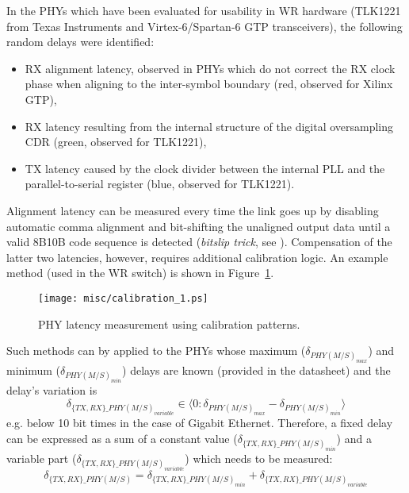 In the PHYs which have been evaluated for usability in WR hardware (TLK1221
from Texas Instruments and Virtex-6/Spartan-6 GTP transceivers), the following
random delays were identified:
\begin{itemize}
\item RX alignment latency, observed in PHYs which do not correct the RX
clock phase when aligning to the inter-symbol boundary (red, observed for
Xilinx GTP),
\item RX latency resulting from the internal structure of the digital
oversampling CDR (green, observed for TLK1221),
\item TX latency caused by the clock divider between the internal PLL and
the parallel-to-serial register (blue, observed for TLK1221).
\end{itemize}
Alignment latency can be measured every time the link goes up by disabling
automatic comma alignment and bit-shifting the unaligned output data
until a valid 8B10B code sequence is detected (\textit{bitslip trick},
see \cite{Peek2010}). Compensation of the latter two latencies, however,
requires additional calibration logic. An example method (used in the WR
switch) is shown in Figure~\ref{fig:phy_latency_measurement}.
\begin{figure}[ht!]
  \centering
  \texttt{[image: misc/calibration\_1.ps]}
  \caption{PHY latency measurement using calibration patterns.}
  \label{fig:phy_latency_measurement}
\end{figure}
Such methods can by applied to the
PHYs whose maximum ($\delta_{PHY(M/S)_{max}}$) and minimum ($\delta_{PHY(M/S)_{min}}$) delays are known 
(provided in the datasheet) and the delay's variation is
\begin{equation}
  \label{eq:fixedDelayVariation}
  \delta_{\{TX, RX\}\_PHY(M/S)_{variable}} \in \langle 0 :\delta_{PHY(M/S)_{max}} - \delta_{PHY(M/S)_{min}} \rangle
\end{equation}
e.g. below 10 bit times in the case of Gigabit Ethernet. 
Therefore, a fixed delay can be expressed as a sum of a constant value 
($\delta_{\{TX, RX\}\_PHY(M/S)_{min}}$) and a variable part ($\delta_{\{TX, RX\}\_PHY(M/S)_{variable}}$) which needs to be measured:
\begin{equation}
  \label{eq:fixedDelay}
  \delta_{\{TX, RX\}\_PHY(M/S)} = \delta_{\{TX, RX\}\_PHY(M/S)_{min}} + \delta_{\{TX, RX\}\_PHY(M/S)_{variable}}
\end{equation}
 


